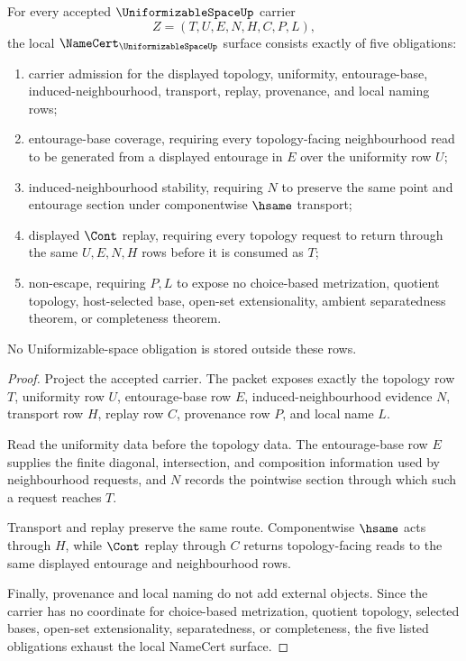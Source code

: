 \begin{theorem}
\label{thm:uniformizable-space-namecert-obligations}
For every accepted $\UniformizableSpaceUp$ carrier
$$
Z=(T,U,E,N,H,C,P,L),
$$
the local $\NameCert_{\UniformizableSpaceUp}$ surface consists exactly of five obligations:
\begin{enumerate}
\item carrier admission for the displayed topology, uniformity, entourage-base, induced-neighbourhood, transport, replay, provenance, and local naming rows;
\item entourage-base coverage, requiring every topology-facing neighbourhood read to be generated from a displayed entourage in $E$ over the uniformity row $U$;
\item induced-neighbourhood stability, requiring $N$ to preserve the same point and entourage section under componentwise $\hsame$ transport;
\item displayed $\Cont$ replay, requiring every topology request to return through the same $U,E,N,H$ rows before it is consumed as $T$;
\item non-escape, requiring $P,L$ to expose no choice-based metrization, quotient topology, host-selected base, open-set extensionality, ambient separatedness theorem, or completeness theorem.
\end{enumerate}
No Uniformizable-space obligation is stored outside these rows.
\end{theorem}
\begin{proof}
Project the accepted carrier. The packet exposes exactly the topology row $T$, uniformity row $U$, entourage-base row $E$, induced-neighbourhood evidence $N$, transport row $H$, replay row $C$, provenance row $P$, and local name $L$.

Read the uniformity data before the topology data. The entourage-base row $E$ supplies the finite diagonal, intersection, and composition information used by neighbourhood requests, and $N$ records the pointwise section through which such a request reaches $T$.

Transport and replay preserve the same route. Componentwise $\hsame$ acts through $H$, while $\Cont$ replay through $C$ returns topology-facing reads to the same displayed entourage and neighbourhood rows.

Finally, provenance and local naming do not add external objects. Since the carrier has no coordinate for choice-based metrization, quotient topology, selected bases, open-set extensionality, separatedness, or completeness, the five listed obligations exhaust the local NameCert surface.
\end{proof}

